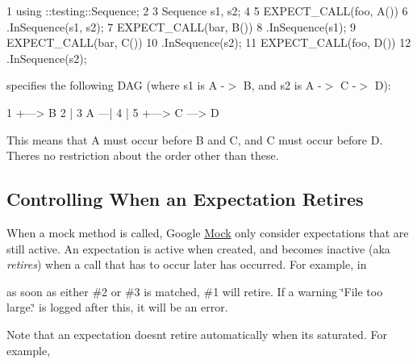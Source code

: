 \begin{DoxyCode}
1 using ::testing::Sequence;
2 
3 Sequence s1, s2;
4 
5 EXPECT\_CALL(foo, A())
6     .InSequence(s1, s2);
7 EXPECT\_CALL(bar, B())
8     .InSequence(s1);
9 EXPECT\_CALL(bar, C())
10     .InSequence(s2);
11 EXPECT\_CALL(foo, D())
12     .InSequence(s2);
\end{DoxyCode}


specifies the following D\+AG (where {\ttfamily s1} is {\ttfamily A -\/$>$ B}, and {\ttfamily s2} is {\ttfamily A -\/$>$ C -\/$>$ D})\+:


\begin{DoxyCode}
1      +---> B
2      |
3 A ---|
4      |
5      +---> C ---> D
\end{DoxyCode}


This means that A must occur before B and C, and C must occur before D. There\textquotesingle{}s no restriction about the order other than these.

\subsection*{Controlling When an Expectation Retires}

When a mock method is called, Google \hyperlink{class_mock}{Mock} only consider expectations that are still active. An expectation is active when created, and becomes inactive (aka {\itshape retires}) when a call that has to occur later has occurred. For example, in




as soon as either \#2 or \#3 is matched, \#1 will retire. If a warning {\ttfamily \char`\"{}\+File too large.\char`\"{}} is logged after this, it will be an error.

Note that an expectation doesn\textquotesingle{}t retire automatically when it\textquotesingle{}s saturated. For example,




